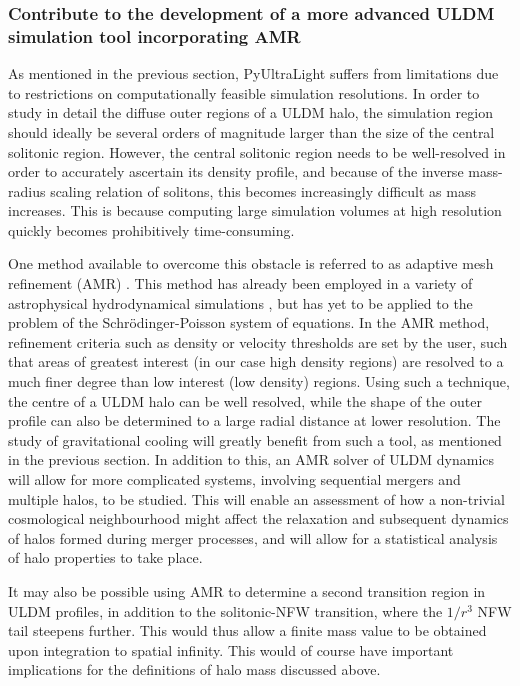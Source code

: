 \subsubsection{Contribute to the development of a more advanced ULDM simulation tool incorporating AMR}

As mentioned in the previous section, PyUltraLight suffers from limitations due to restrictions on computationally feasible simulation resolutions. In order to study in detail the diffuse outer regions of a ULDM halo, the simulation region should ideally be several orders of magnitude larger than the size of the central solitonic region. However, the central solitonic region needs to be well-resolved in order to accurately ascertain its density profile, and because of the inverse mass-radius scaling relation of solitons, this becomes increasingly difficult as mass increases. This is because computing large simulation volumes at high resolution quickly becomes prohibitively time-consuming.

One method available to overcome this obstacle is referred to as adaptive mesh refinement (AMR) \cite{2018arXiv181001319B, Snaith:2018ghc}. This method has already been employed in a variety of astrophysical hydrodynamical simulations \cite{Almgren:2013sz}, but has yet to be applied to the problem of the Schr{\"o}dinger-Poisson system of equations. In the AMR method, refinement criteria such as density or velocity thresholds are set by the user, such that areas of greatest interest (in our case high density regions) are resolved to a much finer degree than low interest (low density) regions. Using such a technique, the centre of a ULDM halo can be well resolved, while the shape of the outer profile can also be determined to a large radial distance at lower resolution. The study of gravitational cooling will greatly benefit from such a tool, as mentioned in the previous section. In addition to this, an AMR solver of ULDM dynamics will allow for more complicated systems, involving sequential mergers and multiple halos, to be studied. This will enable an assessment of how a non-trivial cosmological neighbourhood might affect the relaxation and subsequent dynamics of halos formed during merger processes, and will allow for a statistical analysis of halo properties to take place.

It may also be possible using AMR to determine a second transition region in ULDM profiles, in addition to the solitonic-NFW transition, where the $1/r^3$ NFW tail steepens further. This would thus allow a finite mass value to be obtained upon integration to spatial infinity. This would of course have important implications for the definitions of halo mass discussed above. 

